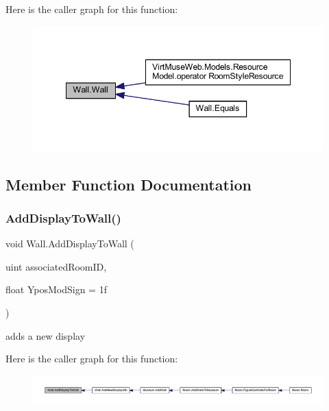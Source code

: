 Here is the caller graph for this function\+:
\nopagebreak
\begin{figure}[H]
\begin{center}
\leavevmode
\includegraphics[width=348pt]{class_wall_a4c5f79551eaa6006ef8d243c6cb4407f_icgraph}
\end{center}
\end{figure}


\subsection{Member Function Documentation}
\mbox{\label{class_wall_a2c2ccc6de461b4979816536859ef591c}} 
\subsubsection{\texorpdfstring{Add\+Display\+To\+Wall()}{AddDisplayToWall()}}
{\footnotesize\ttfamily void Wall.\+Add\+Display\+To\+Wall (\begin{DoxyParamCaption}\item[{uint}]{associated\+Room\+ID,  }\item[{float}]{Ypos\+Mod\+Sign = {\ttfamily 1f} }\end{DoxyParamCaption})\hspace{0.3cm}{\ttfamily [private]}}



adds a new display 

Here is the caller graph for this function\+:
\nopagebreak
\begin{figure}[H]
\begin{center}
\leavevmode
\includegraphics[width=350pt]{class_wall_a2c2ccc6de461b4979816536859ef591c_icgraph}
\end{center}
\end{figure}
\mbox{\label{class_wall_aaed262c3f6b37525136f3278ca2e80cb}} 
